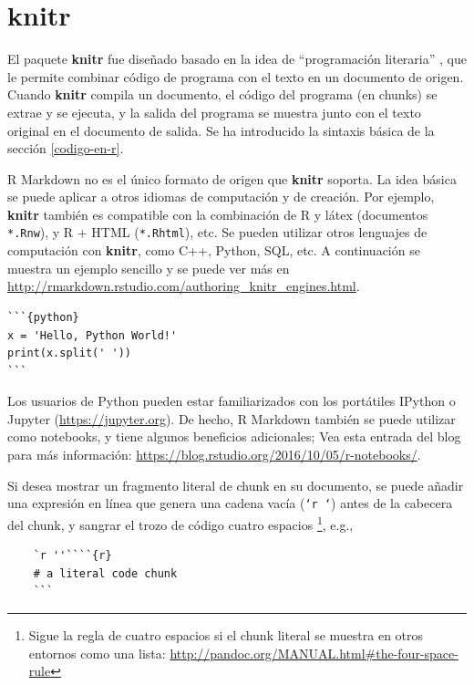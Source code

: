 \documentclass[12pt,]{krantz}
\theoremstyle{definition}
\theoremstyle{definition}
\theoremstyle{remark}
\begin{document}
\section{knitr}\label{knitr}

El paquete \textbf{knitr} fue diseñado basado en la idea de
``programación literaria'' \citep{knuth1984}, que le permite combinar
código de programa con el texto en un documento de origen. Cuando
\textbf{knitr} compila un documento, el código del programa (en chunks)
se extrae y se ejecuta, y la salida del programa se muestra junto con el
texto original en el documento de salida. Se ha introducido la sintaxis
básica de la sección \ref{codigo-en-r}.

R Markdown no es el único formato de origen que \textbf{knitr} soporta.
La idea básica se puede aplicar a otros idiomas de computación y de
creación. Por ejemplo, \textbf{knitr} también es compatible con la
combinación de R y látex (documentos \texttt{*.Rnw}), y R + HTML
(\texttt{*.Rhtml}), etc. Se pueden utilizar otros lenguajes de
computación con \textbf{knitr}, como C++, Python, SQL, etc. A
continuación se muestra un ejemplo sencillo y se puede ver más en
\url{http://rmarkdown.rstudio.com/authoring_knitr_engines.html}.

\begin{verbatim}
```{python}
x = 'Hello, Python World!'
print(x.split(' '))
```
\end{verbatim}

Los usuarios de Python pueden estar familiarizados con los portátiles
IPython  o Jupyter
(\url{https://jupyter.org}). De hecho, R
Markdown también se puede utilizar como notebooks, y tiene algunos
beneficios adicionales; Vea esta entrada del blog para más información:
\url{https://blog.rstudio.org/2016/10/05/r-notebooks/}.

Si desea mostrar un fragmento literal de chunk en su documento, se puede
añadir una expresión en línea que genera una cadena vacía
(\texttt{`r\ \textquotesingle{}\textquotesingle{}`}) antes de la
cabecera del chunk, y sangrar el trozo de código cuatro espacios
\footnote{Sigue la regla de cuatro espacios si el chunk literal se
  muestra en otros entornos como una lista:
  \url{http://pandoc.org/MANUAL.html\#the-four-space-rule}}, e.g.,

\begin{verbatim}
    `r ''````{r}
    # a literal code chunk
    ```
\end{verbatim}
\end{document}
